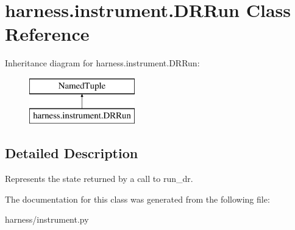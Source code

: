 \hypertarget{classharness_1_1instrument_1_1_d_r_run}{}\section{harness.\+instrument.\+D\+R\+Run Class Reference}
\label{classharness_1_1instrument_1_1_d_r_run}
Inheritance diagram for harness.\+instrument.\+D\+R\+Run\+:\begin{figure}[H]
\begin{center}
\leavevmode
\includegraphics[height=2.000000cm]{dc/d34/classharness_1_1instrument_1_1_d_r_run}
\end{center}
\end{figure}


\subsection{Detailed Description}
\begin{DoxyVerb}Represents the state returned by a call to run_dr.
\end{DoxyVerb}
 

The documentation for this class was generated from the following file\+:\begin{DoxyCompactItemize}
\item 
harness/instrument.\+py\end{DoxyCompactItemize}
